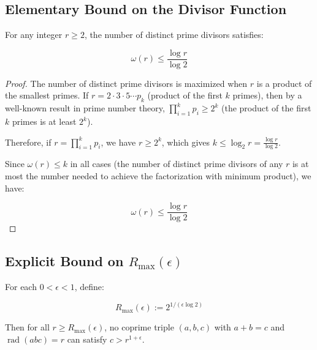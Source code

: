 \subsection{Elementary Bound on the Divisor Function}
\label{subsec:elementary-omega-bound}

\begin{lemma}
\label{lem:elementary-omega-bound}

For any integer $r \geq 2$, the number of distinct prime divisors satisfies:

\begin{equation}
\omega(r) \leq \frac{\log r}{\log 2}
\end{equation}

\end{lemma}

\begin{proof}

The number of distinct prime divisors is maximized when $r$ is a product of the smallest primes. If $r = 2 \cdot 3 \cdot 5 \cdots p_k$ (product of the first $k$ primes), then by a well-known result in prime number theory, $\prod_{i=1}^k p_i \geq 2^k$ (the product of the first $k$ primes is at least $2^k$).

Therefore, if $r = \prod_{i=1}^k p_i$, we have $r \geq 2^k$, which gives $k \leq \log_2 r = \frac{\log r}{\log 2}$.

Since $\omega(r) \leq k$ in all cases (the number of distinct prime divisors of any $r$ is at most the number needed to achieve the factorization with minimum product), we have:

\begin{equation}
\omega(r) \leq \frac{\log r}{\log 2}
\end{equation}

\end{proof}

\subsection{Explicit Bound on $R_{\max}(\epsilon)$}
\label{subsec:rmax-explicit-bound}

\begin{theorem}
\label{thm:rmax-explicit-elementary}

For each $0 < \epsilon < 1$, define:

\begin{equation}
R_{\max}(\epsilon) := 2^{1/(\epsilon \log 2)}
\end{equation}

Then for all $r \geq R_{\max}(\epsilon)$, no coprime triple $(a, b, c)$ with $a+b=c$ and $\operatorname{rad}(abc) = r$ can satisfy $c > r^{1+\epsilon}$.

\end{theorem}

